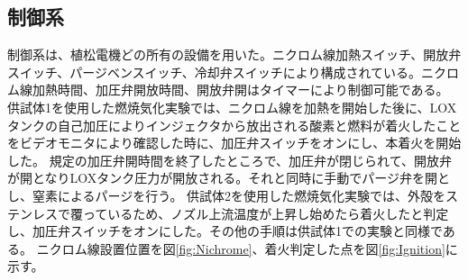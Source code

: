 \subsection{制御系}
制御系は、植松電機どの所有の設備を用いた。ニクロム線加熱スイッチ、開放弁スイッチ、パージベンスイッチ、冷却弁スイッチにより構成されている。ニクロム線加熱時間、加圧弁開放時間、開放弁開はタイマーにより制御可能である。
\\
供試体1を使用した燃焼気化実験では、ニクロム線を加熱を開始した後に、LOXタンクの自己加圧によりインジェクタから放出される酸素と燃料が着火したことをビデオモニタにより確認した時に、加圧弁スイッチをオンにし、本着火を開始した。
規定の加圧弁開時間を終了したところで、加圧弁が閉じられて、開放弁が開となりLOXタンク圧力が開放される。それと同時に手動でパージ弁を開とし、窒素によるパージを行う。
供試体2を使用した燃焼気化実験では、外殻をステンレスで覆っているため、ノズル上流温度が上昇し始めたら着火したと判定し、加圧弁スイッチをオンにした。その他の手順は供試体1での実験と同様である。
ニクロム線設置位置を図\ref{fig:Nichrome}、着火判定した点を図\ref{fig:Ignition}に示す。
